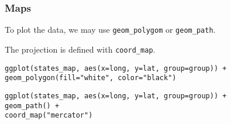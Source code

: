 \documentclass{beamer}
\begin{document}
	\begin{frame}[fragile]
		\frametitle{Maps}

		To plot the data, we may use \verb|geom_polygom| or \verb|geom_path|.

		\vspace{2em}

		The projection is defined with \verb|coord_map|.

		\vspace{2em}
	
		\begin{exampleblock}{}
		\begin{BVerbatim}
ggplot(states_map, aes(x=long, y=lat, group=group)) +
geom_polygon(fill="white", color="black")
		\end{BVerbatim}
		\end{exampleblock}{}

		\vspace{2em}

		\begin{exampleblock}{}
		\begin{BVerbatim}
ggplot(states_map, aes(x=long, y=lat, group=group)) +
geom_path() +
coord_map("mercator")
		\end{BVerbatim}
		\end{exampleblock}{}

	\end{frame}
\end{document}
